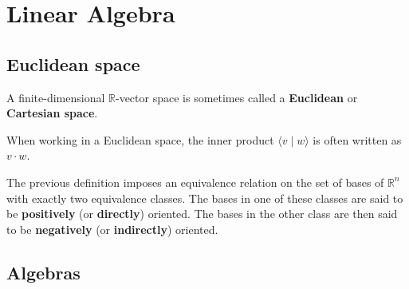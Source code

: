 \chapter{Linear Algebra}\label{chapter:linear_algebra}

    \minitoc






\section{Euclidean space}

    A finite-dimensional $\mathbb{R}$-vector space is sometimes called a \textbf{Euclidean} or \textbf{Cartesian space}.

    \begin{notation}
        When working in a Euclidean space, the inner product $\langle v\mid w \rangle$ is often written as $v\cdot w$.
    \end{notation}

    \begin{result}
        The previous definition imposes an equivalence relation on the set of bases of $\mathbb{R}^n$ with exactly two equivalence classes. The bases in one of these classes are said to be \textbf{positively} (or \textbf{directly}) oriented. The bases in the other class are then said to be \textbf{negatively} (or \textbf{indirectly}) oriented.
    \end{result}

\section{Algebras}

